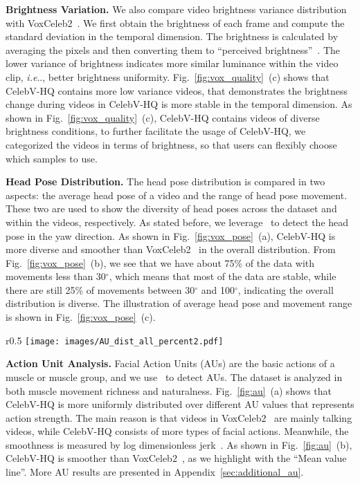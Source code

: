 \documentclass[runningheads]{llncs}
\makeatletter
\DeclareRobustCommand\onedot{\futurelet\@let@token\@onedot}
\def\@onedot{\ifx\@let@token.\else.\null\fi\xspace}
\def\ie{\emph{i.e}\onedot} \def\Ie{\emph{I.e}\onedot}
\makeatother
\begin{document}
\noindent \textbf{Brightness Variation. }
We also compare video brightness variance distribution with VoxCeleb2~\cite{vox2}. We first obtain the brightness of each frame and compute the standard deviation in the temporal dimension. 
The brightness is calculated by averaging the pixels and then converting them to ``perceived brightness''~\cite{bezryadin2007brightness}.
The lower variance of brightness indicates more similar luminance within the video clip, \ie, better brightness uniformity. Fig.~\ref{fig:vox_quality}~(c) shows that CelebV-HQ contains more low variance videos, that demonstrates the brightness change during videos in CelebV-HQ is more stable in the temporal dimension.
As shown in Fig.~\ref{fig:vox_quality}~(c), CelebV-HQ contains videos of diverse brightness conditions, to further facilitate the usage of CelebV-HQ, we categorized the videos in terms of brightness, so that users can flexibly choose which samples to use. 



\noindent \textbf{Head Pose Distribution.}
The head pose distribution is compared in two aspects: the average head pose of a video and the range of head pose movement. These two are used to show the diversity of head poses across the dataset and within the videos, respectively. As stated before, we leverage~\cite{wu2018look} to detect the head pose in the yaw direction. 
As shown in Fig.~\ref{fig:vox_pose}~(a), CelebV-HQ is more diverse and smoother than VoxCeleb2~\cite{vox2} in the overall distribution. From Fig.~\ref{fig:vox_pose}~(b), we see that we have about 75\% of the data with movements less than 30$^{\circ}$, which means that most of the data are stable, while there are still 25\% of movements between 30$^{\circ}$ and 100$^{\circ}$, indicating the overall distribution is diverse. The illustration of average head pose and  movement range is shown in Fig.~\ref{fig:vox_pose}~(c).

\begin{wrapfigure}{r}{0.5\textwidth}
\vspace{-5mm}
\centering
\texttt{[image: images/AU\_dist\_all\_percent2.pdf]}
\caption{\textbf{Distribution and smoothness of action units.} We evaluate the distribution (a) and smoothness (b) of action units.}
\label{fig:au}
\vspace{-5mm}
\end{wrapfigure}

\noindent \textbf{Action Unit Analysis.}
Facial Action Units (AUs) are the basic actions of a muscle or muscle group, and we use~\cite{fan2020fau} to detect AUs. 
The dataset is analyzed in both muscle movement richness and naturalness.
Fig.~\ref{fig:au}~(a) shows that CelebV-HQ is more uniformly distributed over different AU values that represents action strength. The main reason is that videos in VoxCeleb2~\cite{vox2} are mainly talking videos, while CelebV-HQ consists of more types of facial actions. Meanwhile, the smoothness is measured by log dimensionless jerk~\cite{ldljerk}. As shown in Fig.~\ref{fig:au}~(b), CelebV-HQ is smoother than VoxCeleb2~\cite{vox2}, as we highlight with the ``Mean value line''. More AU results are presented in Appendix~\ref{sec:additional_au}.
\end{document}
